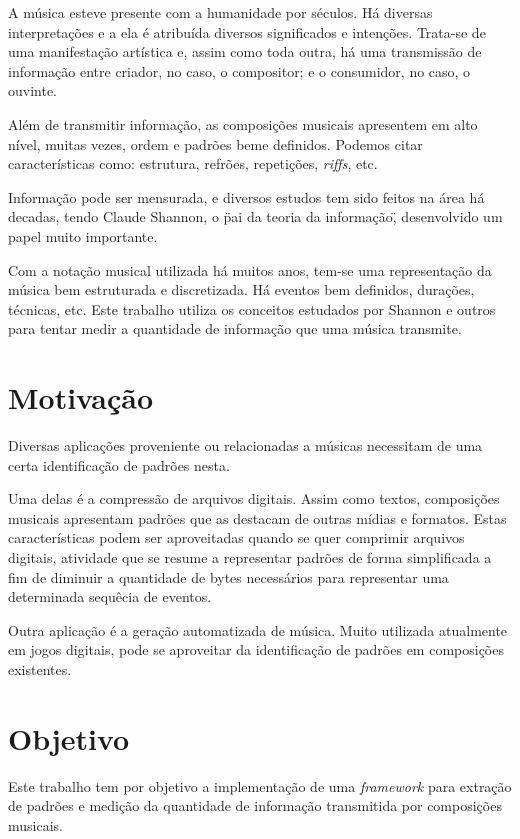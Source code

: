 A música esteve presente com a humanidade por séculos. Há diversas interpretações e a ela é atribuída diversos significados e intenções. Trata-se de uma manifestação artística e, assim como toda outra, há uma transmissão de informação entre criador, no caso, o compositor; e o consumidor, no caso, o ouvinte.

Além de transmitir informação, as composições musicais apresentem em alto nível, muitas vezes, ordem e padrões beme definidos. Podemos citar características como: estrutura, refrões, repetições, \textit{riffs}, etc.

Informação pode ser mensurada, e diversos estudos tem sido feitos na área há decadas, tendo Claude Shannon, o \"pai da teoria da informação\", desenvolvido um papel muito importante. \cite{shannon}

Com a notação musical utilizada há muitos anos, tem-se uma representação da música bem estruturada e discretizada. Há eventos bem definidos, durações, técnicas, etc. Este trabalho utiliza os conceitos estudados por Shannon e outros para tentar medir a quantidade de informação que uma música transmite.

\section{Motivação}

Diversas aplicações proveniente ou relacionadas a músicas necessitam de uma certa identificação de padrões nesta.

Uma delas é a compressão de arquivos digitais. Assim como textos, composições musicais apresentam padrões que as destacam de outras mídias e formatos. Estas características podem ser aproveitadas quando se quer comprimir arquivos digitais, atividade que se resume a representar padrões de forma simplificada a fim de diminuir a quantidade de bytes necessários para representar uma determinada sequêcia de eventos.

Outra aplicação é a geração automatizada de música. Muito utilizada atualmente em jogos digitais, pode se aproveitar da identificação de padrões em composições existentes.

\section{Objetivo}

Este trabalho tem por objetivo a implementação de uma \textit{framework} para extração de padrões e medição da quantidade de informação transmitida por composições musicais.

